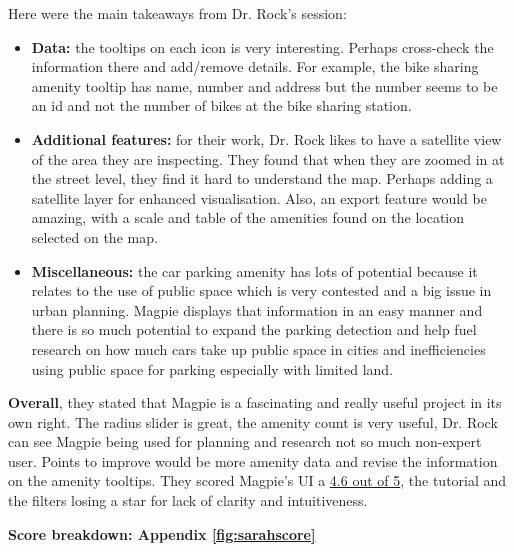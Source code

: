 \newpage{}

Here were the main takeaways from Dr. Rock's session:
\begin{itemize}
    \item \textbf{Data:} the tooltips on each icon is very interesting. Perhaps
          cross-check the information there and add/remove details. For example, the
          bike sharing amenity tooltip has name, number and address but the number
          seems to be an id and not the number of bikes at the bike sharing station.
          \vspace{0.2cm}
          
    \item \textbf{Additional features:} for their work, Dr. Rock likes to have a
          satellite view of the area they are inspecting. They found that when they
          are zoomed in at the street level, they find it hard to understand the map.
          Perhaps adding a satellite layer for enhanced visualisation. Also, an
          export feature would be amazing, with a scale and table of the amenities
          found on the location selected on the map.
          \vspace{0.2cm}
          
    \item \textbf{Miscellaneous:} the car parking amenity has lots of potential
          because it relates to the use of public space which is very contested and a
          big issue in urban planning. Magpie displays that information in an easy
          manner and there is so much potential to expand the parking detection and
          help fuel research on how much cars take up public space in cities and
          inefficiencies using public space for parking especially with limited land.
          
\end{itemize}

\textbf{Overall}, they stated that Magpie is a fascinating and really useful
project in its own right. The radius slider is great, the amenity count is very
useful, Dr. Rock can see Magpie being used for planning and research not so much
non-expert user. Points to improve would be more amenity data and revise the
information on the amenity tooltips. They scored Magpie's UI a \underline{4.6
    out of 5}, the tutorial and the filters losing a star for lack of clarity and
intuitiveness.

\hspace{2em}\textbf{Score breakdown: Appendix \ref{fig:sarahscore}}

